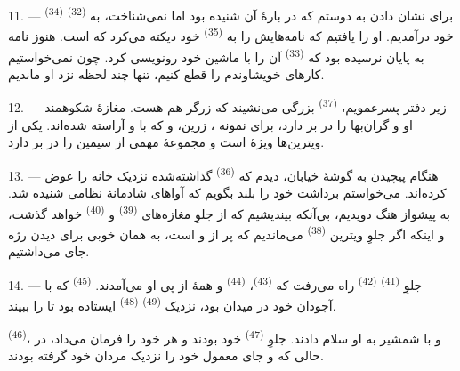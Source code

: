 11. --- برای نشان دادن  به دوستم که در بارهٔ آن
شنیده بود اما نمی‌شناخت، به  \textsuperscript{(32)}
 \textsuperscript{(34)} خود درآمدیم. او را یافتیم که
نامه‌هایش را به  \textsuperscript{(35)} خود دیکته می‌کرد
که  است. هنوز نامه به پایان نرسیده بود که
 \textsuperscript{(33)} آن را با ماشین خود رونویسی
کرد. چون نمی‌خواستیم کارهای خویشاوندم را قطع کنیم، تنها چند لحظه نزد
او ماندیم.

12. --- زیر دفتر پسرعمویم، 
\textsuperscript{(37)} بزرگی می‌نشیند که زرگر هم هست. مغازهٔ شکوهمند او
 و
 گران‌بها را در بر دارد، برای نمونه ،  زرین،  و
 که با  و 
آراسته شده‌اند. یکی از ویترین‌ها ویژهٔ  است و مجموعهٔ
مهمی از  سیمین را در بر دارد.

13. --- هنگام پیچیدن به گوشهٔ خیابان، دیدم که 
\textsuperscript{(36)} گذاشته‌شده نزدیک  خانه را عوض
کرده‌اند. می‌خواستم برداشت خود را بلند بگویم که آواهای شادمانهٔ
 نظامی شنیده شد. به پیشواز هنگ دویدیم، بی‌آنکه بیندیشیم
که  از جلوِ مغازه‌های 
\textsuperscript{(39)} و  \textsuperscript{(40)}
خواهد گذشت، و اینکه اگر جلوِ ویترین 
\textsuperscript{(38)} می‌ماندیم که پر از  و  است، به همان خوبی برای
دیدن رژه جای می‌داشتیم.

\VUsaut{3.0mm}

14. --- جلوِ  \textsuperscript{(41)}  \textsuperscript{(42)} راه می‌رفت که 
\textsuperscript{(43)}،  \textsuperscript{(44)} و
همهٔ  از پی او می‌آمدند. 
\textsuperscript{(45)} که با آجودان خود در میدان بود، نزدیک
 \textsuperscript{(49)} 
\textsuperscript{(48)} ایستاده بود تا  را ببیند.

 \textsuperscript{(46)}،  و
 با شمشیر به او سلام دادند.  جلوِ
 \textsuperscript{(47)} خود بودند و هر
  خود را فرمان می‌داد، در حالی که
 و  جای معمول خود را
نزدیک مردان خود گرفته بودند.

